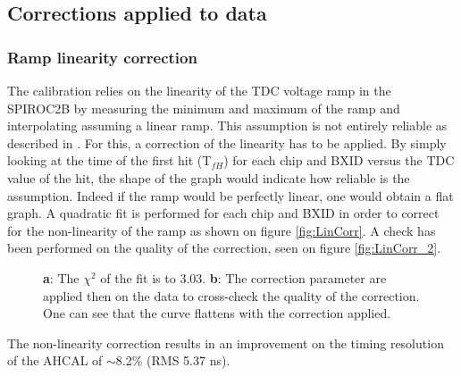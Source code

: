 \documentclass[twoside,a4paper,11pt]{article}
\begin{document}
\subsection{Corrections applied to data}
\subsubsection{Ramp linearity correction}
\label{subsec:lin_corr}

The calibration relies on the linearity of the TDC voltage ramp in the SPIROC2B by measuring the minimum and maximum of the ramp and interpolating assuming a linear ramp. This assumption is not entirely reliable as described in \cite{OskarSSP, EldwanSSP}. For this, a correction of the linearity has to be applied. By simply looking at the time of the first hit (T$_{fH}$) for each chip and BXID versus the TDC value of the hit, the shape of the graph would indicate how reliable is the assumption. Indeed if the ramp would be perfectly linear, one would obtain a flat graph.
A quadratic fit is performed for each chip and BXID in order to correct for the non-linearity of the ramp as shown on figure \ref{fig:LinCorr}. A check has been performed on the quality of the correction, seen on figure \ref{fig:LinCorr_2}.
\begin{figure}[htbp]
	\hfill
	\caption[]{\textbf{a}: The $\chi^2$ of the fit is to 3.03. \textbf{b}: The correction parameter are applied then on the data to cross-check the quality of the correction. One can see that the curve flattens with the correction applied.}
\end{figure}
The non-linearity correction results in an improvement on the timing resolution of the AHCAL of $\sim$8.2\% (RMS 5.37 ns).
\end{document}
